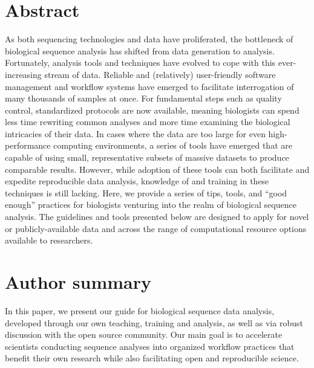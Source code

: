 \documentclass[10pt,letterpaper]{article}
\begin{document}
\section*{Abstract} %
As both sequencing technologies and data have proliferated, the bottleneck of biological sequence analysis has shifted from data generation to analysis. 
Fortunately, analysis tools and techniques have evolved to cope with this ever-increasing stream of data. 
Reliable and (relatively) user-friendly software management and workflow systems have emerged to facilitate interrogation of many thousands of samples at once. 
For fundamental steps such as quality control, standardized protocols are now available, meaning biologists can spend less time rewriting common analyses and more time examining the biological intricacies of their data. 
In cases where the data are too large for even high-performance computing environments, a series of tools have emerged that are capable of using small, representative subsets of massive datasets to produce comparable results. 
However, while adoption of these tools can both facilitate and expedite reproducible data analysis, knowledge of and training in these techniques is still lacking. 
Here, we provide a series of tips, tools, and “good enough” practices for biologists venturing into the realm of biological sequence analysis.
The guidelines and tools presented below are designed to apply for novel or publicly-available data and across the range of computational resource options available to researchers.



{\section*{Author summary}
In this paper, we present our guide for biological sequence data analysis, developed through our own teaching, training and analysis, as well as via robust discussion with the open source community. %
Our main goal is to accelerate scientists conducting sequence analyses into organized workflow practices that benefit their own research while also facilitating open and reproducible science.
}
\end{document}
